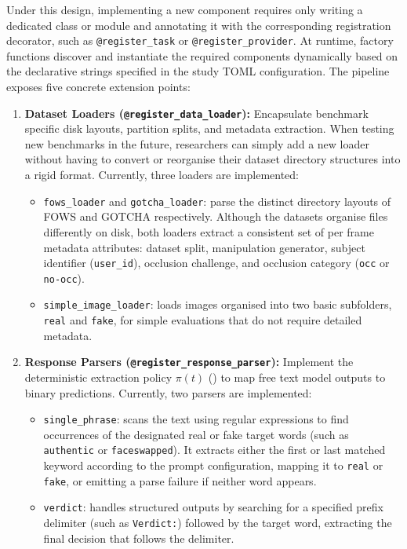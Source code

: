 Under this design, implementing a new component requires only writing a dedicated class or module and annotating it with the corresponding registration decorator, such as \texttt{@register\_task} or \texttt{@register\_provider}. At runtime, factory functions discover and instantiate the required components dynamically based on the declarative strings specified in the study TOML configuration. The pipeline exposes five concrete extension points:
\begin{enumerate}
    \item \textbf{Dataset Loaders (\texttt{@register\_data\_loader}):} Encapsulate benchmark specific disk layouts, partition splits, and metadata extraction. When testing new benchmarks in the future, researchers can simply add a new loader without having to convert or reorganise their dataset directory structures into a rigid format. Currently, three loaders are implemented:
    \begin{itemize}
        \item \texttt{fows\_loader} and \texttt{gotcha\_loader}: parse the distinct directory layouts of FOWS and GOTCHA respectively. Although the datasets organise files differently on disk, both loaders extract a consistent set of per frame metadata attributes: dataset split, manipulation generator, subject identifier (\texttt{user\_id}), occlusion challenge, and occlusion category (\texttt{occ} or \texttt{no-occ}).
        \item \texttt{simple\_image\_loader}: loads images organised into two basic subfolders, \texttt{real} and \texttt{fake}, for simple evaluations that do not require detailed metadata.
    \end{itemize}
    
    \item \textbf{Response Parsers (\texttt{@register\_response\_parser}):} Implement the deterministic extraction policy $\pi(t)$ () to map free text model outputs to binary predictions. Currently, two parsers are implemented:
    \begin{itemize}
        \item \texttt{single\_phrase}: scans the text using regular expressions to find occurrences of the designated real or fake target words (such as \texttt{authentic} or \texttt{faceswapped}). It extracts either the first or last matched keyword according to the prompt configuration, mapping it to \texttt{real} or \texttt{fake}, or emitting a parse failure if neither word appears.
        \item \texttt{verdict}: handles structured outputs by searching for a specified prefix delimiter (such as \texttt{Verdict:}) followed by the target word, extracting the final decision that follows the delimiter.
    \end{itemize}
    

\end{enumerate}
